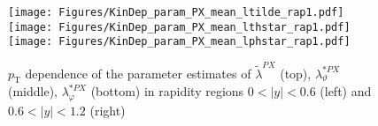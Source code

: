 \documentclass[12pt]{article}
\newcommand{\pT}{p_\mathrm{T}}
\newcommand{\absy}{\left |  y \right |}
\newcommand{\lamtildePX}{\tilde{\lambda}^{\scriptscriptstyle PX}}
\newcommand{\lamthstarPX}{\lambda^{* \scriptscriptstyle PX}_\vartheta}
\newcommand{\lamphstarPX}{\lambda^{* \scriptscriptstyle PX}_\varphi}
\begin{document}
\begin{figure}[htbp]
\centering
\texttt{[image: Figures/KinDep\_param\_PX\_mean\_ltilde\_rap1.pdf]}
\texttt{[image: Figures/KinDep\_param\_PX\_mean\_lthstar\_rap1.pdf]}
\texttt{[image: Figures/KinDep\_param\_PX\_mean\_lphstar\_rap1.pdf]}
\caption{$\pT$ dependence of the parameter estimates of $\lamtildePX$ (top),
$\lamthstarPX$ (middle), $\lamphstarPX$ (bottom) in rapidity regions $0<\absy<0.6$ (left) and $0.6<\absy<1.2$ (right)}
\end{figure}
\clearpage
\end{document}
